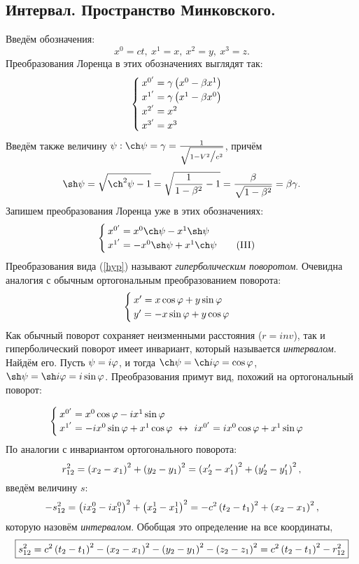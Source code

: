 \subsection{Интервал. Пространство Минковского.}
    Введём обозначения:
    \[
        x^0 = ct, \ x^1 = x, \ x^2 = y, \ x^3 = z.
    \]
    Преобразования Лоренца в этих обозначениях выглядят так:
    \[ \begin{cases}
        x^{0'} = \gamma \left({x^0 - \beta x^1}\right) \\
        x^{1'} = \gamma \left({x^1 - \beta x^0}\right) \\
        x^{2'} = x^2 \\
        x^{3'} = x^3
    \end{cases} \]
    Введём также величину $\psi : \ch \psi = \gamma = \frac{1}{\Relroot}$, причём
    \[
        \sh \psi = \sqrt{\ch^2 \psi - 1} = \sqrt{\frac{1}{1 - \beta^2} - 1} = \frac{\beta}{\sqrt{1 - \beta^2}} = \beta \gamma.
    \]
    Запишем преобразования Лоренца уже в этих обозначениях:
    \[ \begin{cases}
        x^{0'} = x^0 \ch \psi - x^1 \sh \psi \\
        x^{1'} = - x^0 \sh \psi + x^1 \ch \psi \tag{\Romannum{3}}\label{hyp}
    \end{cases} \]
    Преобразования вида (\ref{hyp}) называют {\it гиперболическим поворотом}. Очевидна аналогия с обычным ортогональным преобразованием поворота:
    \[ \begin{cases}
        x' = x\cos\varphi + y\sin\varphi \\
        y' = -x\sin\varphi + y\cos\varphi
    \end{cases} \]
    Как обычный поворот сохраняет неизменными расстояния ($r = inv$), так и гиперболический поворот имеет инвариант, который называется {\it интервалом}. Найдём его. 
    Пусть $\psi = i\varphi$, и тогда $\ch\psi = \ch i\phee = \cos\phee$, $\sh\psi = \sh i\phee = i\sin\phee$. Преобразования примут вид, похожий на ортогональный поворот:

    \[ \begin{cases}
        x^{0'} = x^0 \cos\phee - ix^1\sin\phee \\
        x^{1'} = -ix^0\sin\phee + x^1\cos\phee \ \leftrightarrow \ ix^{0'} = ix^0\cos\phee + x^1\sin\phee
    \end{cases} \]
    По аналогии с инвариантом ортогонального поворота:
    \[
        r_{12}^2 = \left({x_2 - x_1}\right)^2 + \left({y_2 - y_1}\right)^2 = \left({x_2' - x_1'}\right)^2 + \left({y_2' - y_1'}\right)^2,
    \]
    введём величину $s$:
    \[
        -s_{12}^2 = \left({ix_2^0 - ix_1^0}\right)^2 + \left({x_2^1 - x_1^1}\right)^2 = -c^2\left({t_2 - t_1}\right)^2 + \left({x_2 - x_1}\right)^2,
    \]
    которую назовём {\it интервалом}. Обобщая это определение на все координаты,
    \[
        \boxed{s_{12}^2 =c^2\left({t_2 - t_1}\right)^2 - \left({x_2 - x_1}\right)^2 - \left({y_2 - y_1}\right)^2 - \left({z_2 - z_1}\right)^2 = c^2 \left({t_2 - t_1}\right)^2 - r_{12}^2}
    \]

